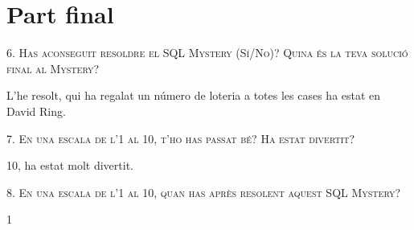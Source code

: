 \documentclass[a4paper,12pt]{article}
\begin{document}
\newpage
\section{Part final}

\textsc{6. Has aconseguit resoldre el SQL Mystery (Sí/No)? Quina és la teva solució final al Mystery?}

L'he resolt, qui ha regalat un número de loteria a totes les cases ha estat en David Ring.

\textsc{7. En una escala de l’1 al 10, t’ho has passat bé? Ha estat divertit?}

10, ha estat molt divertit.

\textsc{8. En una escala de l’1 al 10, quan has après resolent aquest SQL Mystery?}

1
\end{document}
